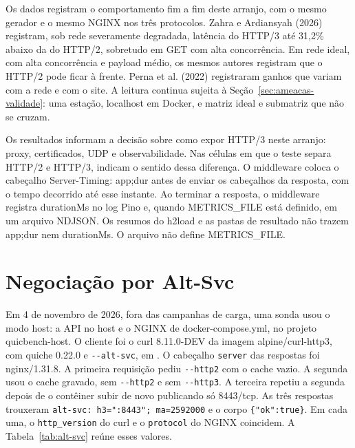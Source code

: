 Os dados registram o comportamento fim a fim deste arranjo, com o mesmo gerador e o mesmo NGINX nos três protocolos. Zahra e Ardiansyah (2026) registram, sob rede severamente degradada, latência do HTTP/3 até 31,2\% abaixo da do HTTP/2, sobretudo em GET com alta concorrência. Em rede ideal, com alta concorrência e payload médio, os mesmos autores registram que o HTTP/2 pode ficar à frente. Perna et al. (2022) registraram ganhos que variam com a rede e com o site. A leitura continua sujeita à Seção~\ref{sec:ameacas-validade}: uma estação, localhost em Docker, e matriz ideal e submatriz que não se cruzam.

Os resultados informam a decisão sobre como expor HTTP/3 neste arranjo: proxy, certificados, UDP e observabilidade. Nas células em que o teste separa HTTP/2 e HTTP/3, indicam o sentido dessa diferença. O middleware coloca o cabeçalho Server-Timing: app;dur antes de enviar os cabeçalhos da resposta, com o tempo decorrido até esse instante. Ao terminar a resposta, o middleware registra durationMs no log Pino e, quando METRICS\_FILE está definido, em um arquivo NDJSON. Os resumos do h2load e as pastas de resultado não trazem app;dur nem durationMs. O arquivo  não define METRICS\_FILE.

\section{Negociação por Alt-Svc}\label{sec:alt-svc}

Em 4 de novembro de 2026, fora das campanhas de carga, uma sonda usou o modo host: a API no host e o NGINX de docker-compose.yml, no projeto quicbench-host. O cliente foi o curl 8.11.0-DEV da imagem alpine/curl-http3, com quiche 0.22.0 e \texttt{-{}-alt-svc}, em . O cabeçalho \texttt{server} das respostas foi nginx/1.31.8. A primeira requisição pediu \texttt{-{}-http2} com o cache vazio. A segunda usou o cache gravado, sem \texttt{-{}-http2} e sem \texttt{-{}-http3}. A terceira repetiu a segunda depois de o contêiner subir de novo publicando só 8443/tcp. As três respostas trouxeram \texttt{alt-svc: h3=\string":8443\string"; ma=2592000} e o corpo \texttt{\{\string"ok\string":true\}}. Em cada uma, o \texttt{http\_version} do curl e o \texttt{protocol} do NGINX coincidem. A Tabela~\ref{tab:alt-svc} reúne esses valores.


